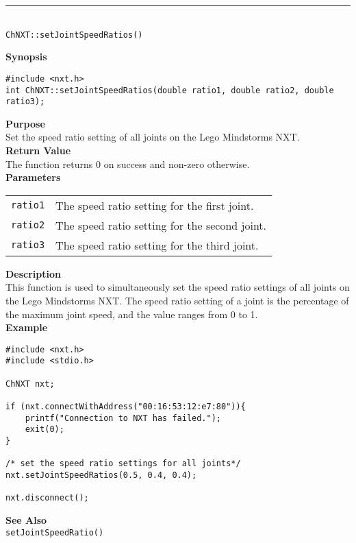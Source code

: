 \noindent
\vspace{5pt}
\rule{4.5in}{0.015in}\\
\noindent
{\LARGE \texttt{ChNXT::setJointSpeedRatios()} }\\


\noindent
{\bf Synopsis}
\vspace{-8pt}
\begin{verbatim}
#include <nxt.h>
int ChNXT::setJointSpeedRatios(double ratio1, double ratio2, double ratio3);
\end{verbatim}

\noindent
{\bf Purpose}\\
Set the speed ratio setting of all joints on the Lego Mindstorms NXT.\\

\noindent
{\bf Return Value}\\
The function returns 0 on success and non-zero otherwise.\\

\noindent
{\bf Parameters}\\
\vspace{-0.1in}
\begin{description}
\item
\begin{tabular}{ p{20mm}p{135mm} }
\texttt{ratio1}&The speed ratio setting for the first joint.\\
\texttt{ratio2}&The speed ratio setting for the second joint.\\
\texttt{ratio3}&The speed ratio setting for the third joint.\\
\end{tabular}
\end{description}

\noindent
{\bf Description}\\
This function is used to simultaneously set the speed ratio settings 
of all joints on the Lego Mindstorms NXT. The speed ratio setting of
a joint is the percentage of the maximum joint speed, and the value 
ranges from 0 to 1.\\

\noindent
{\bf Example}
\begin{verbatim}
#include <nxt.h> 
#include <stdio.h>

ChNXT nxt;

if (nxt.connectWithAddress("00:16:53:12:e7:80")){
    printf("Connection to NXT has failed.");
    exit(0);
}
    
/* set the speed ratio settings for all joints*/
nxt.setJointSpeedRatios(0.5, 0.4, 0.4);

nxt.disconnect();
\end{verbatim}

\noindent
{\bf See Also}\\
\texttt{setJointSpeedRatio()}\\
